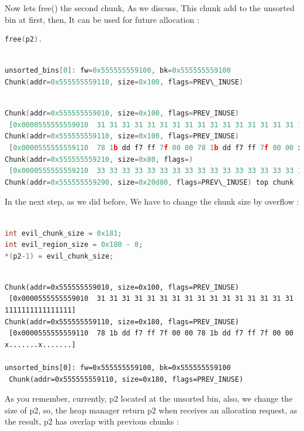 \documentclass{masterthesis}
\begin{document}
Now lets free() the second chunk, As we discuss, This chunk add to the unsorted bin at first, then, It can be used for future allocation :

\begin{lstlisting}[language=c,frame=tlrb]
free(p2).
 \end{lstlisting}

\begin{lstlisting}[language=c,frame=tlrb]

unsorted_bins[0]: fw=0x555555559100, bk=0x555555559100
Chunk(addr=0x555555559110, size=0x100, flags=PREV\_INUSE)
\end{lstlisting}

\begin{lstlisting}[language=c,frame=tlrb]

Chunk(addr=0x555555559010, size=0x100, flags=PREV_INUSE)
 [0x0000555555559010  31 31 31 31 31 31 31 31 31 31 31 31 31 31 31 31 1111111111111111]
Chunk(addr=0x555555559110, size=0x100, flags=PREV_INUSE)
 [0x0000555555559110  78 1b dd f7 ff 7f 00 00 78 1b dd f7 ff 7f 00 00 x.......x.......]
Chunk(addr=0x555555559210, size=0x80, flags=)
 [0x0000555555559210  33 33 33 33 33 33 33 33 33 33 33 33 33 33 33 33 3333333333333333]
Chunk(addr=0x555555559290, size=0x20d80, flags=PREV\_INUSE) top chunk

 \end{lstlisting}
In the next step, as we did before, We have to change the chunk size by overflow :
\begin{lstlisting}[language=c,frame=tlrb]

int evil_chunk_size = 0x181;
int evil_region_size = 0x180 - 8;
*(p2-1) = evil_chunk_size;
 \end{lstlisting}
\begin{lstlisting}[frame=tlrb]

Chunk(addr=0x555555559010, size=0x100, flags=PREV_INUSE)
 [0x0000555555559010  31 31 31 31 31 31 31 31 31 31 31 31 31 31 31 31 1111111111111111]
Chunk(addr=0x555555559110, size=0x180, flags=PREV_INUSE)
 [0x0000555555559110  78 1b dd f7 ff 7f 00 00 78 1b dd f7 ff 7f 00 00 x.......x.......]

unsorted_bins[0]: fw=0x555555559100, bk=0x555555559100
 Chunk(addr=0x555555559110, size=0x180, flags=PREV_INUSE)
 \end{lstlisting}
 
As you remember, currently, p2 located at the unsorted bin, also, we change the size of p2, so, the heap manager return p2 when receives an allocation request, as the result, p2 has overlap with previous chunks :
\end{document}

